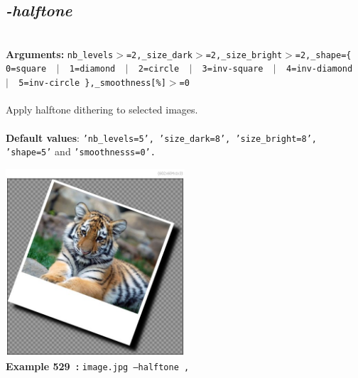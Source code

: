 \documentclass[a4paper,11pt,twoside]{book}
\begin{document}
\subsection{\emph{-halftone} }\vspace*{-0.5em}
~\\\textbf{Arguments: } 
{\small \texttt{nb\_levels$>$=2,\_size\_dark$>$=2,\_size\_bright$>$=2,\_shape=\{ 0=square ~$|$~ 1=diamond ~$|$~ 2=circle ~$|$~ 3=inv-square ~$|$~ 4=inv-diamond ~$|$~ 5=inv-circle \},\_smoothness[\%]$>$=0}}\\~\\
Apply halftone dithering to selected images.
~\\~\\\textbf{Default values}: {\small \texttt{'nb\_levels=5', 'size\_dark=8', 'size\_bright=8', 'shape=5'} and \texttt{'smoothnesss=0'.}}
\begin{center}\includegraphics[keepaspectratio=true,height=7cm,width=\textwidth]{img/gmic_def529.jpg}\\
{\footnotesize \textbf{Example 529~:} \texttt{image.jpg --halftone ,}}
\end{center}
\end{document}
